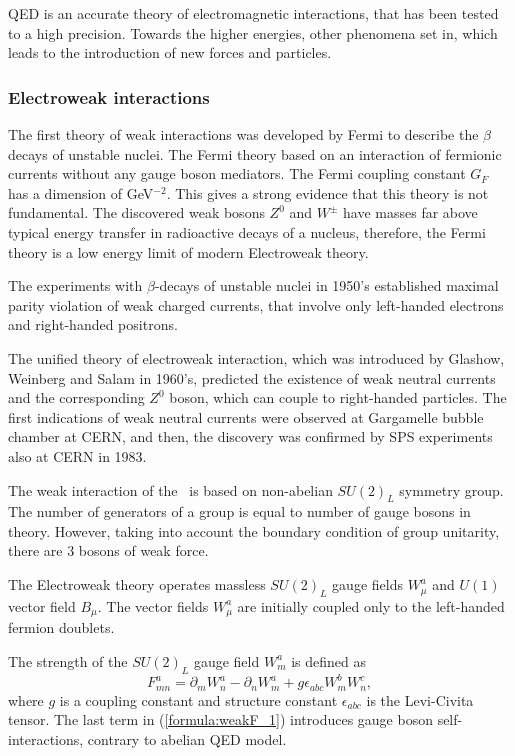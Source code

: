 QED is an accurate theory of electromagnetic interactions, that has been tested to a high precision. 
Towards the higher energies, other phenomena set in, which leads to the introduction of new forces and particles. 

\subsubsection{Electroweak interactions}
\label{sec:EWT_SM}
The first theory of weak interactions was developed by Fermi to describe the $\beta$ decays of unstable nuclei. The Fermi theory based on an interaction of fermionic currents without any gauge boson mediators. The Fermi coupling constant $G_F$ has a dimension of GeV$^{-2}$. This gives a strong evidence that this theory is not fundamental. The discovered weak bosons $Z^0$ and $W^\pm$ have masses far above typical energy transfer in radioactive decays of a nucleus, therefore, the Fermi theory is a low energy limit of modern Electroweak theory.

The experiments with $\beta$-decays of unstable nuclei in 1950's established maximal parity violation of weak charged currents, that involve only left-handed electrons and right-handed positrons. 

The unified theory of electroweak interaction, which was introduced by Glashow, Weinberg and Salam in 1960's, predicted the existence of weak neutral currents and the corresponding $Z^0$ boson, which can couple to right-handed particles. 
The first indications of weak neutral currents were observed at Gargamelle bubble chamber at CERN, and then, the discovery was confirmed by SPS experiments also at CERN in 1983. 

The weak interaction of the \sm\ is based on non-abelian $SU(2)_L$ symmetry group. The number of generators of a group is equal to number of gauge bosons in theory. However, taking into account the boundary condition of group unitarity, there are 3 bosons of weak force. 

The Electroweak theory operates massless $SU(2)_L$ gauge fields $W^a_\mu$ and $U(1)$ vector field $B_\mu$. The vector fields $W^a_\mu$ are initially coupled only to the left-handed fermion doublets.

The strength of the $SU(2)_L$ gauge field $W_m^a$ is defined as
\begin{equation}
	F_{mn}^a =  \partial_m W_n^a - \partial_n W_m^a + g \epsilon_{abc}W_m^b W_n^c,
    \label{formula:weakF_1}
\end{equation}
where $g$ is a coupling constant and structure constant $\epsilon_{abc}$ is the Levi-Civita tensor. The last term in (\ref{formula:weakF_1}) introduces gauge boson self-interactions, contrary to abelian QED model. 

